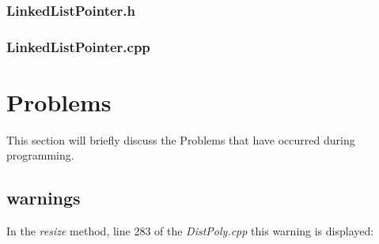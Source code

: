 \documentclass[11pt,titlepage]{article}
\begin{document}
			\subsubsection{LinkedListPointer.h}
				
				
			\subsubsection{LinkedListPointer.cpp}
				
				
	\section{Problems}
	This section will briefly discuss the Problems that have occurred during programming.
		\subsection{warnings}
		In the \emph{resize} method, line 283 of the \emph{DistPoly.cpp} this warning is displayed:
		
		
	
\end{document}

